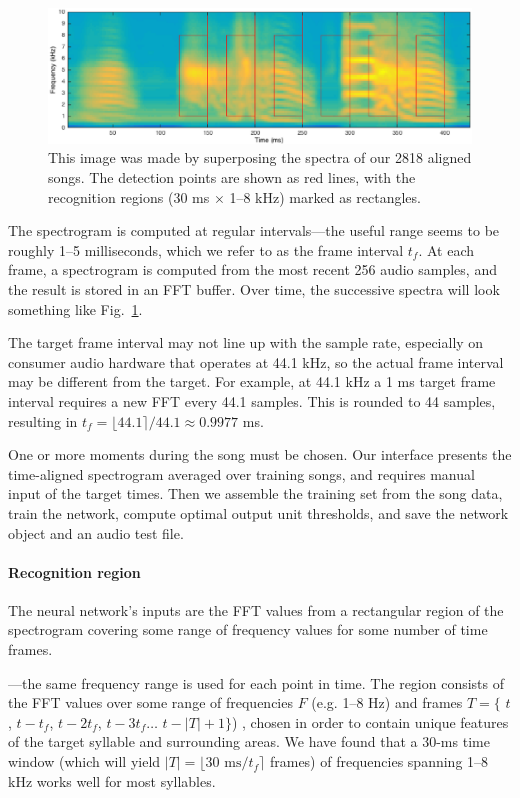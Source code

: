 \documentclass[10pt,letterpaper]{article}
\newcommand\fig[1]{Fig.~\ref{#1}}
\renewcommand{\subsubsection}[1]{\paragraph{#1}}
\begin{document}
\begin{figure}
  \includegraphics[width=\textwidth]{6syllables}
  \caption{This image was made by superposing the spectra of our 2818 aligned songs.  The detection points are shown as red lines, with the recognition regions (30 ms $\times$ 1--8 kHz) marked as rectangles.}
  \label{fig:song}
\end{figure}

The spectrogram is computed at regular intervals---the useful range
seems to be roughly 1--5 milliseconds, which we refer to as the frame
interval $t_f$.  At each frame, a spectrogram is computed from the
most recent 256 audio samples, and the result is stored in an FFT
buffer.  Over time, the successive spectra will look something
like \fig{fig:song}.

The target frame interval may not line up with the sample rate,
especially on consumer audio hardware that operates at 44.1 kHz, so
the actual frame interval may be different from the target.  For
example, at 44.1 kHz a 1 ms target frame interval requires a new FFT
every 44.1 samples.  This is rounded to 44 samples, resulting in
$t_f=\lfloor 44.1 \rceil / 44.1 \approx 0.9977$ ms.

One or more moments during the song must be chosen.  Our interface
presents the time-aligned spectrogram averaged over training songs,
and requires manual input of the target times.  Then we assemble the
training set from the song data, train the network, compute optimal
output unit thresholds, and save the network object and an audio test
file.

\subsubsection{Recognition region}


The neural network's inputs are the FFT values from a rectangular region of the spectrogram
covering some range of frequency values for some number of time
frames.

---the same frequency range is used for each point in time.  The region consists of the FFT
values over some range of frequencies $F$ (e.g. 1--8 Hz) and frames
$T = \{$ $t$, $t-t_f$, $t-{2t_f}$, $t-{3t_f}\ldots$ $t-{|T|}+1\}$) , chosen
in order to contain unique features of the target syllable and
surrounding areas.  We have found that a 30-ms time window (which will
yield $|T|=\lfloor 30\mbox{ ms}/t_f\rceil$ frames) of frequencies
spanning 1--8 kHz works well for most syllables.
\end{document}
